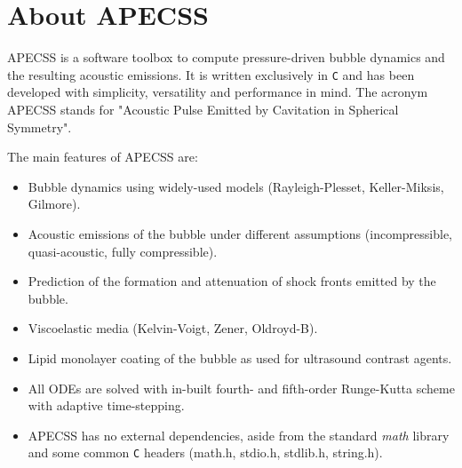 \chapter{About APECSS}

APECSS is a software toolbox to compute pressure-driven bubble dynamics and the resulting acoustic emissions. It is written exclusively in {\tt C} and has been developed with simplicity, versatility and performance in mind. The acronym APECSS stands for "Acoustic Pulse Emitted by Cavitation in Spherical Symmetry".

The main features of APECSS are:\vspace{-1em}
\begin{itemize}[noitemsep]
\item Bubble dynamics using widely-used models (Rayleigh-Plesset, Keller-Miksis, Gilmore).
\item Acoustic emissions of the bubble under different assumptions (incompressible, quasi-acoustic, fully compressible).
\item Prediction of the formation and attenuation of shock fronts emitted by the bubble.
\item Viscoelastic media (Kelvin-Voigt, Zener, Oldroyd-B).
\item Lipid monolayer coating of the bubble as used for ultrasound contrast agents.
\item All ODEs are solved with in-built fourth- and fifth-order Runge-Kutta scheme with adaptive time-stepping.
\item APECSS has no external dependencies, aside from the standard {\it math} library and some common {\tt C} headers (math.h, stdio.h, stdlib.h, string.h).
\end{itemize}

